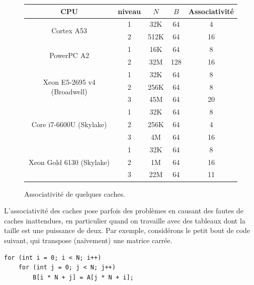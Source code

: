 \begin{figure}
  \centering
  \begin{tabular}{|c|c|c|c|c|}
  \hline
  CPU        & niveau & $N$  & $B$    & Associativité \\
  \hline\hline
    \multirow{2}{*}{Cortex A53} & 1   & 32K    & 64     & 4 \\
                                & 2   & 512K   & 64     & 16 \\
    \hline
    \multirow{2}{*}{PowerPC A2} & 1   & 16K   & 64    & 8 \\
                                & 2   & 32M   & 128   & 16 \\
    \hline
    \multirow{3}{*}{Xeon E5-2695 v4 (Broadwell)}  & 1   & 32K    & 64    & 8  \\
                                                  & 2   & 256K   & 64    & 8  \\
                                                  & 3   & 45M    & 64    & 20  \\
    \hline
    \multirow{3}{*}{Core i7-6600U (Skylake)}      & 1   & 32K    & 64    & 8  \\
                                                  & 2   & 256K   & 64    & 4  \\
                                                  & 3   & 4M     & 64    & 16  \\
    \hline
    \multirow{3}{*}{Xeon Gold 6130 (Skylake)}  & 1   & 32K    & 64    & 8  \\
                                               & 2   & 1M     & 64    & 16  \\
             & 3   & 22M    & 64    & 11  \\
    \hline
  \end{tabular}
\caption{Associativité de quelques caches. \label{tab:cache_associativity}}
\end{figure}

L'associativité des caches pose parfois des problèmes en causant des fautes de
caches inattendues, en particulier quand on travaille avec des tableaux dont la
taille est une puissance de deux. Par exemple, considérons le petit bout de code
suivant, qui transpose (naïvement) une matrice carrée.

\begin{verbatim}
for (int i = 0; i < N; i++)
    for (int j = 0; j < N; j++)
        B[i * N + j] = A[j * N + i];
\end{verbatim}


